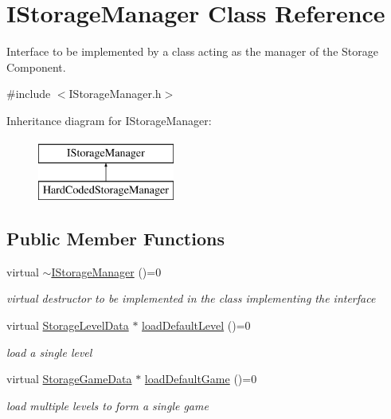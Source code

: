\hypertarget{class_i_storage_manager}{}\section{I\+Storage\+Manager Class Reference}
\label{class_i_storage_manager}


Interface to be implemented by a class acting as the manager of the Storage Component.  




{\ttfamily \#include $<$I\+Storage\+Manager.\+h$>$}

Inheritance diagram for I\+Storage\+Manager\+:\begin{figure}[H]
\begin{center}
\leavevmode
\includegraphics[height=2.000000cm]{class_i_storage_manager}
\end{center}
\end{figure}
\subsection*{Public Member Functions}
\begin{DoxyCompactItemize}
\item 
\mbox{\label{class_i_storage_manager_a5e3d6fa4a26ce40e4a23a13138a2c055}} 
virtual \mbox{\hyperlink{class_i_storage_manager_a5e3d6fa4a26ce40e4a23a13138a2c055}{$\sim$\+I\+Storage\+Manager}} ()=0
\begin{DoxyCompactList}\small\item\em virtual destructor to be implemented in the class implementing the interface \end{DoxyCompactList}\item 
\mbox{\label{class_i_storage_manager_a084b002900fb2973fd329ab849c0a951}} 
virtual \mbox{\hyperlink{class_storage_level_data}{Storage\+Level\+Data}} $\ast$ \mbox{\hyperlink{class_i_storage_manager_a084b002900fb2973fd329ab849c0a951}{load\+Default\+Level}} ()=0
\begin{DoxyCompactList}\small\item\em load a single level \end{DoxyCompactList}\item 
\mbox{\label{class_i_storage_manager_a8b3f961026b2ddea2accccd1a15dd7d9}} 
virtual \mbox{\hyperlink{class_storage_game_data}{Storage\+Game\+Data}} $\ast$ \mbox{\hyperlink{class_i_storage_manager_a8b3f961026b2ddea2accccd1a15dd7d9}{load\+Default\+Game}} ()=0
\begin{DoxyCompactList}\small\item\em load multiple levels to form a single game \end{DoxyCompactList}\end{DoxyCompactItemize}


